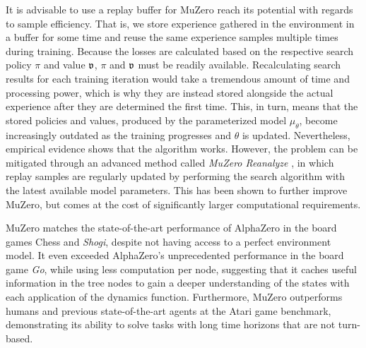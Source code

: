 It is advisable to use a replay buffer for MuZero reach its potential with regards to sample efficiency. That is, we store experience gathered in the environment in a buffer for some time and reuse the same experience samples multiple times during training. Because the losses are calculated based on the respective search policy $\pi$ and value $\mathfrak{v}$, $\pi$ and $\mathfrak{v}$ must be readily available. Recalculating search results for each training iteration would take a tremendous amount of time and processing power, which is why they are instead stored alongside the actual experience after they are determined the first time. This, in turn, means that the stored policies and values, produced by the parameterized model $\mu_\theta$, become increasingly outdated as the training progresses and $\theta$ is updated. Nevertheless, empirical evidence shows that the algorithm works. However, the problem can be mitigated through an advanced method called \textit{MuZero Reanalyze} \cite{muzero}, in which replay samples are regularly updated by performing the search algorithm with the latest available model parameters. This has been shown to further improve MuZero, but comes at the cost of significantly larger computational requirements.

MuZero matches the state-of-the-art performance of AlphaZero in the board games Chess and \textit{Shogi}, despite not having access to a perfect environment model. It even exceeded AlphaZero's unprecedented performance in the board game \textit{Go}, while using less computation per node, suggesting that it caches useful information in the tree nodes to gain a deeper understanding of the states with each application of the dynamics function. Furthermore, MuZero outperforms humans and previous state-of-the-art agents at the Atari game benchmark, demonstrating its ability to solve tasks with long time horizons that are not turn-based.